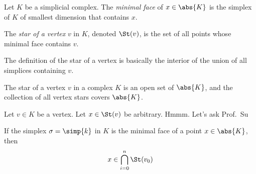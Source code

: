 \begin{definition}
  Let $K$ be a simplicial complex. The \emph{minimal face} of $x \in \abs{K}$ is
  the simplex of $K$ of smallest dimension that contains $x$.
\end{definition}
\begin{definition}
  The \emph{star of a vertex} $v$ in $K$, denoted $\St(v)$, is the set of all
  points whose minimal face contains $v$.
\end{definition}
\begin{remark}
  The definition of the star of a vertex is basically the interior of the union
  of all simplices containing $v$.
\end{remark}
\begin{problem}[15.27]
  The star of a vertex $v$ in a complex $K$ is an open set of $\abs{K}$, and the
  collection of all vertex stars covers $\abs{K}$.
\end{problem}
\begin{solution}
  Let $v \in K$ be a vertex. Let $x \in \St(v)$ be arbitrary. Hmmm. Let's ask
  Prof.\ Su
\end{solution}
\begin{problem}[15.28]
  If the simplex $\sigma = \simp{k}$ in $K$ is the minimal face of a point $x
  \in \abs{K}$, then
  \[
    x \in \bigcap_{i=0}^n \St(v_0)
  \]
\end{problem}
\begin{solution}

\end{solution}
